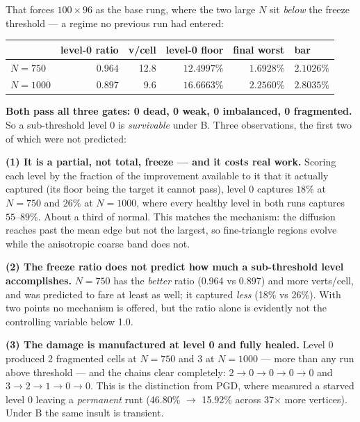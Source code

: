 \documentclass[11pt,a4paper]{article}
\begin{document}
That forces \(100\times96\) as the base rung, where the two large \(N\) sit
\emph{below} the freeze threshold --- a regime no previous run had entered:

\begin{center}\small
\begin{tabular}{@{}lrrrrl@{}}
\toprule
 & level-0 ratio & v/cell & level-0 floor & final worst & bar \\
\midrule
\(N{=}750\)  & \(0.964\) & 12.8 & \(12.4997\%\) & \(\mathbf{1.6928\%}\) & \(2.1026\%\) \\
\(N{=}1000\) & \(0.897\) & \phantom{0}9.6 & \(16.6663\%\) & \(\mathbf{2.2560\%}\) & \(2.8035\%\) \\
\bottomrule
\end{tabular}
\end{center}

\textbf{Both pass all three gates: 0 dead, 0 weak, 0 imbalanced, 0 fragmented.}
So a sub-threshold level 0 is \emph{survivable} under B. Three observations, the
first two of which were not predicted:

\textbf{(1) It is a partial, not total, freeze --- and it costs real work.}
Scoring each level by the fraction of the improvement available to it that it
actually captured (its floor being the target it cannot pass), level 0 captures
\(18\%\) at \(N{=}750\) and \(26\%\) at \(N{=}1000\), where every healthy level
in both runs captures \(55\text{--}89\%\). About a third of normal. This matches
the mechanism: the diffusion reaches past the mean edge but not the largest, so
fine-triangle regions evolve while the anisotropic coarse band does not.

\textbf{(2) The freeze ratio does not predict how much a sub-threshold level
accomplishes.} \(N{=}750\) has the \emph{better} ratio (0.964 vs 0.897) and more
verts/cell, and was predicted to fare at least as well; it captured \emph{less}
(18\% vs 26\%). With two points no mechanism is offered, but the ratio alone is
evidently not the controlling variable below 1.0.

\textbf{(3) The damage is manufactured at level 0 and fully healed.} Level 0
produced 2 fragmented cells at \(N{=}750\) and 3 at \(N{=}1000\) --- more than any
run above threshold --- and the chains clear completely:
\(2 \to 0 \to 0 \to 0 \to 0\) and \(3 \to 2 \to 1 \to 0 \to 0\). This is the
distinction from PGD, where 
measured a starved level 0 leaving a \emph{permanent} runt (46.80\% \(\to\)
15.92\% across 37\(\times\) more vertices). Under B the same insult is transient.
\end{document}
